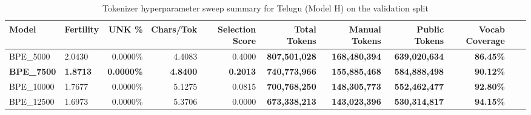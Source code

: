 \documentclass[8pt]{article}
\begin{document}
    \begin{table}[!htp]
        \centering
        \footnotesize %
        \setlength{\tabcolsep}{3.5pt} %
        \begin{tabular*}{\textwidth}{llrrrrrrrrr}
            \toprule
            \textbf{Model} & 
            \textbf{Fertility} & \textbf{UNK \%} & \textbf{Chars/Tok} &
            \textbf{Selection Score} & \textbf{Total Tokens} &
            \textbf{Manual Tokens} & \textbf{Public Tokens} & \textbf{Vocab Coverage} \\
            \midrule
            BPE\_5000   & 2.0430 & 0.0000\% & 4.4083 & 0.4000 &
            \textbf{807,501,028} & \textbf{168,480,394} & \textbf{639,020,634} & \textbf{86.45\%} \\
    
            \textbf{BPE\_7500}  & 
            \textbf{1.8713} & \textbf{0.0000\%} & \textbf{4.8400} & \textbf{0.2013} &
            \textbf{740,773,966} & \textbf{155,885,468} & \textbf{584,888,498} & \textbf{90.12\%} \\
    
            BPE\_10000 & 1.7677 & 0.0000\% & 5.1275 & 0.0815 &
            \textbf{700,768,250} & \textbf{148,305,773} & \textbf{552,462,477} & \textbf{92.80\%} \\
    
            BPE\_12500 & 1.6973 & 0.0000\% & 5.3706 & 0.0000 &
            \textbf{673,338,213} & \textbf{143,023,396} & \textbf{530,314,817} & \textbf{94.15\%} \\
    
            \bottomrule
        \end{tabular*}
        \caption{Tokenizer hyperparameter sweep summary for Telugu (Model H) on the validation split}
        \label{tab:telugu_sweep}
    \end{table}
\end{document}
